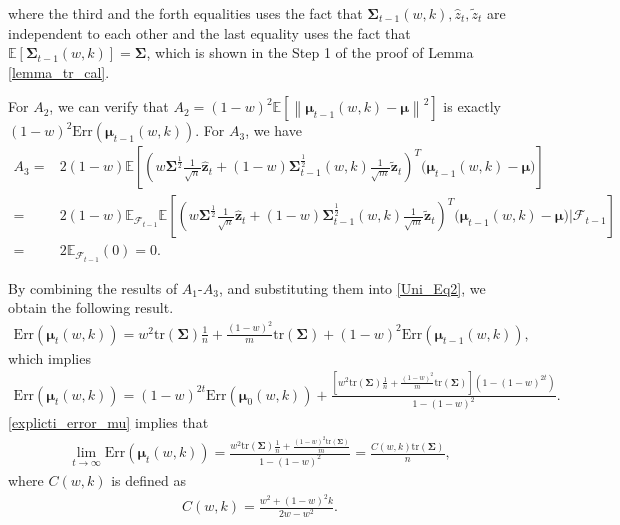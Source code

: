 where the third and  the forth equalities uses the fact that $\bm{\Sigma}_{t-1}(w,k),\widehat{z}_t,\widetilde{z}_t$ are independent to each other and the last equality uses the fact that $\mathbb{E}[\bm{\Sigma}_{t-1}(w,k)]=\bm{\Sigma}$, which is shown in the Step 1 of the proof of Lemma \ref{lemma_tr_cal}.

For $A_2$, we can verify that $A_2=(1-w)^2\mathbb{E}\left[\left\|\bm{\mu}_{t-1}(w,k)-\bm{\mu}\right\|^2\right]$ is exactly $(1-w)^2 \text{Err} (\bm{\mu}_{t-1} (w,k) ) $. For $A_3$, we have 
\begin{align*}
A_3=&2(1-w)\mathbb{E}\left[\left(w \bm{\Sigma}^{\frac{1}{2}} \frac{1}{\sqrt{n}}\widehat{\bm{z}}_t + (1-w)\bm{\Sigma}_{t-1}^{\frac{1}{2}}(w,k)\frac{1}{\sqrt{m}}\widetilde{\bm{z}}_t\right)^T
\Big(\bm{\mu}_{t-1}(w,k)-\bm{\mu}\Big)\right]\\
=&2(1-w)\mathbb{E}_{\mathcal{F}_{t-1}}\mathbb{E}\left[    \left(w \bm{\Sigma}^{\frac{1}{2}} \frac{1}{\sqrt{n}}\widehat{\bm{z}}_t + (1-w)\bm{\Sigma}_{t-1}^{\frac{1}{2}}(w,k)\frac{1}{\sqrt{m}}\widetilde{\bm{z}}_t\right)^T
\Big(\bm{\mu}_{t-1}(w,k)-\bm{\mu}\Big)     \Big| \mathcal{F}_{t-1}  \right]\\
=&2\mathbb{E}_{\mathcal{F}_{t-1}}(0)=0.
\end{align*}

By combining the results of $A_1$-$A_3$, and substituting them into \eqref{Uni_Eq2}, we obtain the following result.
\begin{align*}
\text{Err}(\bm{\mu}_t (w,k) )=w^2 \mathrm{tr}(\bm{\Sigma}) \frac{1}{n} +\frac{(1-w)^2}{m} \mathrm{tr}(\bm{\Sigma})+(1-w)^2\text{Err}( \bm{\mu}_{t-1}(w,k) ),
\end{align*}
which implies
\begin{align}
\label{explicti_error_mu}
\text{Err}(\bm{\mu}_t (w,k)) =(1-w)^{2t}\text{Err}( \bm{\mu}_{0}(w,k)  )
+\frac{
[w^2\mathrm{tr}(\bm{\Sigma})\frac{1}{n}+\frac{(1-w)^2}{m}\mathrm{tr}(\bm{\Sigma})](1- (1-w)^{2t} )
}{1-(1-w)^2}.
\end{align}
\eqref{explicti_error_mu} implies that 
\begin{align}
\lim_{t \to \infty} \text{Err}(\bm{\mu}_t (w,k) )=\frac{w^2 \mathrm{tr}(\bm{\Sigma}) \frac{1}{n}+\frac{(1-w)^2 \mathrm{tr}(\bm{\Sigma}) }{m}   }{1 - (1-w)^2}=\frac{C(w,k)\mathrm{tr}(\bm{\Sigma})}{n},
\end{align}
where $C(w,k)$ is defined as
\begin{align*}
    C(w,k) = \frac{w^2+(1-w)^2k}{2w-w^2}.
\end{align*}

